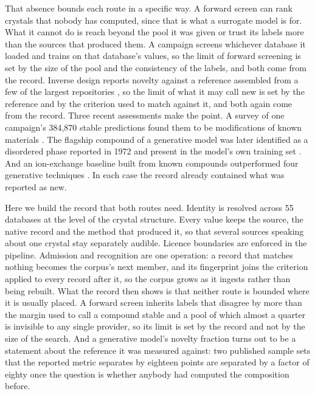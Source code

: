 That absence bounds each route in a specific way. A forward screen can rank
crystals that nobody has computed, since that is what a surrogate model is for.
What it cannot do is reach beyond the pool it was given or trust its labels more
than the sources that produced them. A campaign screens whichever database it
loaded and trains on that database's values, so the limit of forward screening
is set by the size of the pool and the consistency of the labels, and both come
from the record. Inverse design reports novelty against a reference assembled
from a few of the largest repositories
\cite{ramlaoui2025lemat,betala2025lematgenbench}, so the limit of what it may
call new is set by the reference and by the criterion used to match against it,
and both again come from the record. Three recent assessments make the point. A
survey of one campaign's 384{,}870 stable predictions found them to be
modifications of known materials \cite{cheetham2024artificial}. The flagship
compound of a generative model was later identified as a disordered phase
reported in 1972 and present in the model's own training set
\cite{juelsholt2026continued}. And an ion-exchange baseline built from known
compounds outperformed four generative techniques \cite{szymanski2025baselines}.
In each case the record already contained what was reported as new.

Here we build the record that both routes need. Identity is resolved across 55
databases at the level of the crystal structure. Every value keeps the source,
the native record and the method that produced it, so that several sources
speaking about one crystal stay separately audible. Licence boundaries are
enforced in the pipeline. Admission and recognition are one operation: a record
that matches nothing becomes the corpus's next member, and its fingerprint joins
the criterion applied to every record after it, so the corpus grows as it
ingests rather than being rebuilt. What the record then shows is that neither
route is bounded where it is usually placed. A forward screen inherits labels
that disagree by more than the margin used to call a compound stable and a pool
of which almost a quarter is invisible to any single provider, so its limit is
set by the record and not by the size of the search. And a generative model's
novelty fraction turns out to be a statement about the reference it was measured
against: two published sample sets that the reported metric separates by
eighteen points are separated by a factor of eighty once the question is whether
anybody had computed the composition before.
